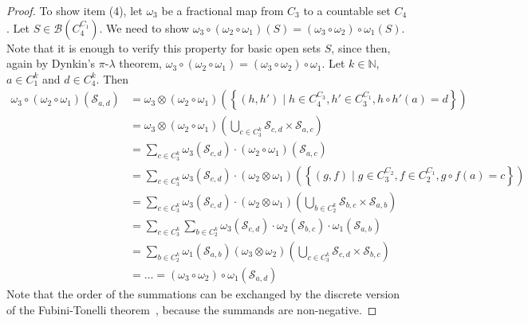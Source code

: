 \documentclass[nonacm]{acmart}
\newcommand{\N}{\mathbb N}
\begin{document}
\begin{proof}
To show item (4), let $\omega_3$ be a fractional map from $C_3$ to a countable set $C_4$. Let $S \in \mathcal{B}(C_4^{C_1})$. We need to show $\omega_3 \circ (\omega_2 \circ \omega_1) (S) = (\omega_3 \circ \omega_2) \circ \omega_1(S)$. Note that it is enough to verify this property for basic open sets $S$, since then, again by Dynkin's $\pi$-$\lambda$ theorem, $\omega_3 \circ (\omega_2 \circ \omega_1) = (\omega_3 \circ \omega_2) \circ \omega_1$. Let $k \in \N$, $a \in C_1^k$ and $d \in C_4^k$. Then  
\begin{align*}
\omega_3 \circ(\omega_2 \circ \omega_1) (\mathscr{S}_{a,d}) &= \omega_3 \otimes (\omega_2 \circ \omega_1)\left(\left\{(h, h') \mid h \in C_4^{C_3}, h' \in C_3^{C_1}, h \circ h'(a) = d \right\}\right) \\
&= \omega_3 \otimes (\omega_2 \circ \omega_1) \left(\bigcup_{c \in C_3^k} \mathscr{S}_{c,d} \times \mathscr{S}_{a,c} \right) \\
&= \sum_{c \in C_3^k} \omega_3(\mathscr{S}_{c,d}) \cdot (\omega_2 \circ \omega_1)(\mathscr{S}_{a,c}) \\
&= \sum_{c \in C_3^k} \omega_3(\mathscr{S}_{c,d}) \cdot (\omega_2 \otimes \omega_1)\left( \left\{(g,f) \mid g \in C_3^{C_2}, f \in C_2^{C_1}, g \circ f(a)=c \right\} \right) \\
&= \sum_{c \in C_3^k} \omega_3(\mathscr{S}_{c,d}) \cdot (\omega_2 \otimes \omega_1) \left(\bigcup_{b \in C_2^k} \mathscr{S}_{b,c} \times \mathscr{S}_{a,b} \right) \\
&= \sum_{c \in C_3^k} \sum_{b \in C_2^k} \omega_3(\mathscr{S}_{c,d})  \cdot \omega_2(\mathscr{S}_{b,c}) \cdot \omega_1(\mathscr{S}_{a,b}) \\
&= \sum_{b \in C_2^k} \omega_1(\mathscr{S}_{a,b}) (\omega_3 \otimes \omega_2) \left(\bigcup_{c \in C_3^k} \mathscr{S}_{c,d} \times \mathscr{S}_{b,c}\right) \\
&= \dots = (\omega_3 \circ \omega_2) \circ \omega_1 (\mathscr{S}_{a,d})
\end{align*}
Note that the order of the summations can be exchanged by the discrete version of the Fubini-Tonelli theorem~\cite[Theorem 14.19]{ProbTheory-Klenke}, because the summands are non-negative. 


\end{proof}
\end{document}
